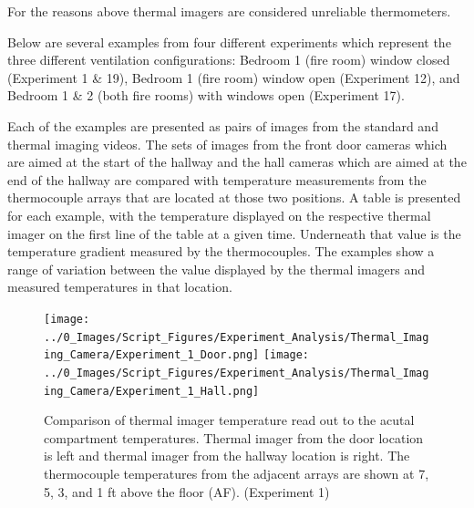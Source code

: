 \documentclass[12pt,oneside]{book}
\begin{document}
For the reasons above thermal imagers are considered unreliable thermometers.

Below are several examples from four different experiments which represent the three different ventilation configurations: Bedroom 1 (fire room) window closed (Experiment 1 \& 19), Bedroom 1 (fire room) window open (Experiment 12), and Bedroom 1 \& 2 (both fire rooms) with windows open (Experiment 17).   

Each of the examples are presented as pairs of images from the standard and thermal imaging videos. The sets of images from the front door cameras which are aimed at the start of the hallway and the hall cameras which are aimed at the end of the hallway are compared with temperature measurements from the thermocouple arrays that are located at those two positions. A table is presented for each example, with the temperature displayed on the respective thermal imager on the first line of the table at a given time.  Underneath that value is the temperature gradient measured by the thermocouples. The examples show a range of variation between the value displayed by the thermal imagers and measured temperatures in that location.  

\begin{figure}[H]
\centering
\texttt{[image: ../0\_Images/Script\_Figures/Experiment\_Analysis/Thermal\_Imaging\_Camera/Experiment\_1\_Door.png]}
\texttt{[image: ../0\_Images/Script\_Figures/Experiment\_Analysis/Thermal\_Imaging\_Camera/Experiment\_1\_Hall.png]}
\caption[Thermal Imager G]{Comparison of thermal imager temperature read out to the acutal compartment temperatures. Thermal imager from the door location is left and thermal imager from the hallway location is right. The thermocouple temperatures from the adjacent arrays are shown at 7, 5, 3, and 1 ft above the floor (AF). (Experiment 1)}
\label{fig:thermal_imager_g}
\end{figure}
\end{document}
